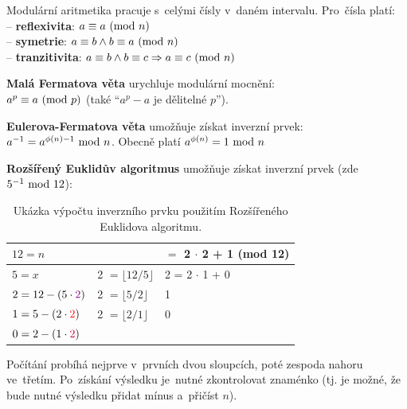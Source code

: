 Modulární aritmetika pracuje s~celými čísly v~daném intervalu. Pro~čísla platí: \\
-- \textbf{reflexivita}: $a \equiv a \ (\mathrm{mod}\ n)$ \\
-- \textbf{symetrie}: $a \equiv b \wedge b \equiv a \ (\mathrm{mod}\ n)$ \\
-- \textbf{tranzitivita}: $a \equiv b \wedge b \equiv c \Rightarrow a \equiv c \ (\mathrm{mod}\ n)$

\vspace*{1em} \noindent
\textbf{Malá Fermatova věta} urychluje modulární mocnění: \\
$a^p \equiv a \ (\mathrm{mod}\ p)$ (také \enquote{$a^p - a$ je dělitelné $p$}).

\vspace*{1em} \noindent
\textbf{Eulerova-Fermatova věta} umožňuje získat inverzní prvek: \\
$a^{-1} = a^{\phi(n) - 1} \ \mathrm{mod}\ n$. Obecně platí $a^{\phi(n)} = 1 \ \mathrm{mod}\ n$

\vspace*{1em} \noindent
\textbf{Rozšířený Euklidův algoritmus} umožňuje získat inverzní prvek (zde $5^{-1} \ \mathrm{mod}\ 12$):

\begin{table}[ht]
	\centering
\begin{tabular}{ll|l}
	$12 = n$                               & {}                                           & \boxed{\stackrel{?}{\pm} 5} $=$ {\color{violet}2} $\cdot$ {\color{blue}2} + {\color{brown}1} (mod 12) \\
	\hline
	$5 = x$                                & {\color{violet}2} $= \lfloor 12 / 5 \rfloor$ & {\color{blue}2} = {\color{red}2} $\cdot$ {\color{brown}1} + {\color{teal}0} \\
	$2 = 12 - (5 \cdot {\color{violet}2})$ & {\color{red}2}    $= \lfloor 5 / 2 \rfloor$  & {\color{brown}1} \\
	$1 = 5 - (2 \cdot {\color{red}2})$     & {\color{purple}2} $= \lfloor 2 / 1 \rfloor$  & {\color{teal}0} \\
	$0 = 2 - (1 \cdot {\color{purple}2})$  & {}                                           & {}
\end{tabular}
\caption*{Ukázka výpočtu inverzního prvku použitím Rozšířeného Euklidova algoritmu.}
\end{table}

\noindent
Počítání probíhá nejprve v~prvních dvou sloupcích, poté zespoda nahoru ve~třetím. Po~získání výsledku je~nutné zkontrolovat znaménko (tj. je možné, že bude nutné výsledku přidat mínus a~přičíst $n$).

